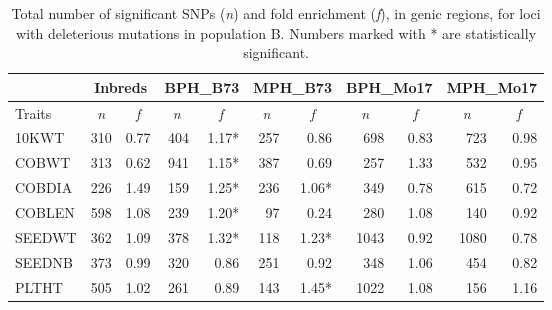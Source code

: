 \documentclass[12pt]{article}
\begin{document}
\begin{table}[ht]
  \begin{center}
    \caption[]{Total number of significant SNPs (\emph{n}) and fold enrichment (\emph{f}), in genic regions, for loci with deleterious mutations in population B. Numbers marked with * are statistically significant.}
{\fontsize{10}{10}\sf
      \begin{tabular}{l|rr|rr|rr|rr|rr} 
\toprule
\multicolumn{1}{c}{}	&	\multicolumn{2}{c}{Inbreds}	&	\multicolumn{2}{c}{BPH\_B73}	&	\multicolumn{2}{c}{MPH\_B73}	&	\multicolumn{2}{c}{BPH\_Mo17}	&	\multicolumn{2}{c}{MPH\_Mo17}	\\	\hline 
Traits	& 	\multicolumn{1}{c}{\emph{n}} 	& 	\multicolumn{1}{c|}{\emph{f}} 	& 	\multicolumn{1}{c}{\emph{n}} 	& 	\multicolumn{1}{c|}{\emph{f}} 	& 	\multicolumn{1}{c}{\emph{n}} 	& 	\multicolumn{1}{c|}{\emph{f}}	& 	\multicolumn{1}{c}{\emph{n}} 	& 	\multicolumn{1}{c|}{\emph{f}} 	& 	\multicolumn{1}{c}{\emph{n}} 	& 	\multicolumn{1}{c}{\emph{f}}	\\	\hline \hline 
10KWT 	& 	310 	& 	0.77 	& 	404 	& 	1.17* 	& 	257 	& 	0.86 	& 	698 	& 	0.83 	& 	723 	& 	0.98	\\
COBWT 	& 	313 	& 	0.62 	& 	941 	& 	1.15* 	& 	387 	& 	0.69 	& 	257 	& 	1.33 	& 	532 	& 	0.95	\\
COBDIA 	& 	226 	& 	1.49 	& 	159 	& 	1.25* 	& 	236 	& 	1.06* 	& 	349 	& 	0.78 	& 	615 	& 	0.72	\\
COBLEN 	& 	598 	& 	1.08 	& 	239 	& 	1.20* 	& 	97 	& 	0.24 	& 	280 	& 	1.08 	& 	140 	& 	0.92	\\
SEEDWT 	& 	362 	& 	1.09 	& 	378 	& 	1.32* 	& 	118 	& 	1.23* 	& 	1043 	& 	0.92 	& 	1080 	& 	0.78	\\
SEEDNB 	& 	373 	& 	0.99 	& 	320 	& 	0.86 	& 	251 	& 	0.92 	& 	348 	& 	1.06 	& 	454 	& 	0.82	\\
PLTHT 	& 	505 	& 	1.02 	& 	261 	& 	0.89 	& 	143 	& 	1.45* 	& 	1022 	& 	1.08 	& 	156 	& 	1.16	\\
\bottomrule
      \end{tabular}
}
    \label{popB_sig_enrichment}  
  \end{center}
\end{table}
\end{document}
